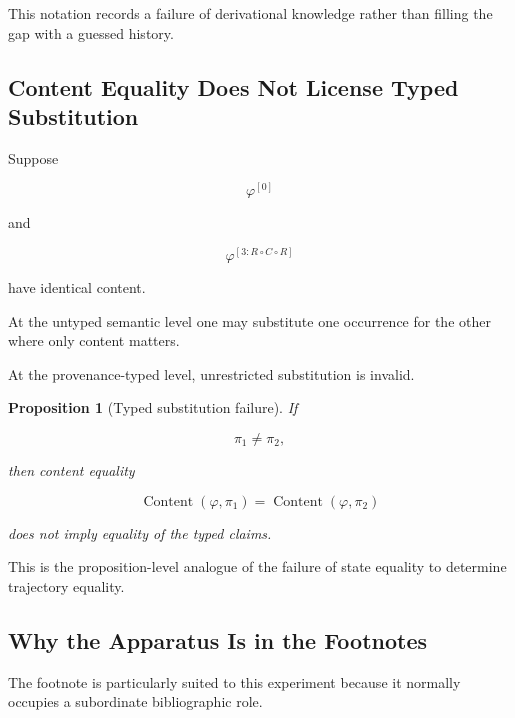 \documentclass[
  11pt,
  a4paper,
  DIV=12,
  BCOR=0mm,
  parskip=half-
]{scrartcl}
\newcommand{\Content}{\operatorname{Content}}
\theoremstyle{definition}
\theoremstyle{plain}
\newtheorem{proposition}[definition]{Proposition}
\theoremstyle{remark}
\begin{document}
This notation records a failure of derivational knowledge rather than filling
the gap with a guessed history.


\subsection{Content Equality Does Not License Typed Substitution}
\label{app:typed-substitution}

Suppose

\[
  \varphi^{[0]}
\]

and

\[
  \varphi^{[3:R\circ C\circ R]}
\]

have identical content.

At the untyped semantic level one may substitute one occurrence for the other
where only content matters.

At the provenance-typed level, unrestricted substitution is invalid.

\begin{proposition}[Typed substitution failure]
\label{prop:typed-substitution}
If

\[
  \pi_1\neq\pi_2,
\]

then content equality

\[
  \Content(\varphi,\pi_1)
  =
  \Content(\varphi,\pi_2)
\]

does not imply equality of the typed claims.
\end{proposition}

This is the proposition-level analogue of the failure of state equality to
determine trajectory equality.


\subsection{Why the Apparatus Is in the Footnotes}
\label{app:footnote-carrier}

The footnote is particularly suited to this experiment because it normally
occupies a subordinate bibliographic role.
\end{document}
